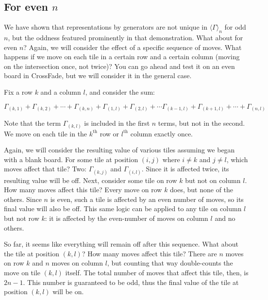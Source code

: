 \documentclass{article}[12pt]
\newcommand{\supt}[1]{^{\text{#1}}}
\newcommand{\gen}[2]{\Gamma_{(#1,#2)}}
\newcommand{\subgroup}[1]{\langle\Gamma\rangle_{#1}}
\begin{document}
\subsection{For even $n$}

We have shown that representations by generators are not unique in $\subgroup{n}$ for odd $n$, but the oddness featured prominently in that demonstration.  What about for even $n$?  Again, we will consider the effect of a specific sequence of moves.  What happens if we move on each tile in a certain row and a certain column (moving on the intersection once, not twice)?  You can go ahead and test it on an even board in CrossFade, but we will consider it in the general case.

Fix a row $k$ and a column $l$, and consider the sum:

\begin{equation}
\label{sum_row_and_col}
\gen{k}{1} + \gen{k}{2} + \cdots + \gen{k}{n} + \gen{1}{l} + \gen{2}{l} + \cdots \gen{k - 1}{l} + \gen{k + 1}{l} + \cdots + \gen{n}{l}
\end{equation}

Note that the term $\gen{k}{l}$ is included in the first $n$ terms, but not in the second.  We move on each tile in the $k\supt{th}$ row or $l\supt{th}$ column exactly once.

Again, we will consider the resulting value of various tiles assuming we began with a blank board.  For some tile at position $(i,j)$ where $i \neq k$ and $j \neq l$, which moves affect that tile?  Two: $\gen{k}{j}$ and $\gen{i}{l}$.  Since it is affected twice, its resulting value will be off.  Next, consider some tile on row $k$ but not on column $l$.  How many moves affect this tile?  Every move on row $k$ does, but none of the others.  Since $n$ is even, such a tile is affected by an even number of moves, so its final value will also be off.  This same logic can be applied to any tile on column $l$ but not row $k$: it is affected by the even-number of moves on column $l$ and no others.

So far, it seems like everything will remain off after this sequence.  What about the tile at position $(k,l)$?  How many moves affect this tile?  There are $n$ moves on row $k$ and $n$ moves on column $l$, but counting that way double-counts the move on tile $(k,l)$ itself.  The total number of moves that affect this tile, then, is $2n - 1$.  This number is guaranteed to be odd, thus the final value of the tile at position $(k,l)$ will be on.
\end{document}
